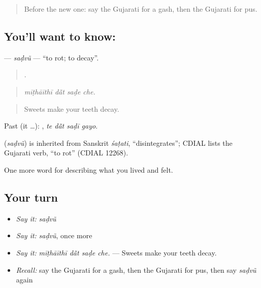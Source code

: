 \label{lesson:GU-C480-sadvu}



\begin{quote}
Before the new one: say the Gujarati for a gash, then the Gujarati for pus.
\end{quote}

\subsection*{You'll want to know: }
\textbf{} — \emph{saḍvũ} — \textquotedblleft{}to rot; to decay\textquotedblright{}.

\begin{quote}
   .
\end{quote}

\begin{quote}
\emph{mīṭhāīthī dā̃t saḍe che.}
\end{quote}

\begin{quote}
Sweets make your teeth decay.
\end{quote}

Past (it …):    , \emph{te dā̃t saḍī gayo}.

\begin{cousinweb}
\textbf{} (\emph{saḍvũ}) is inherited from Sanskrit \emph{śaṭati}, \textquotedblleft{}disintegrates\textquotedblright{}; CDIAL lists the Gujarati verb, \textquotedblleft{}to rot\textquotedblright{} (CDIAL 12268).
\end{cousinweb}

\begin{grammarlens}[title={What you've built}]
One more word for describing what you lived and felt.
\end{grammarlens}

\subsection*{Your turn}
\begin{itemize}
\raggedright
  \item \emph{Say it:} \emph{saḍvũ}
  \item \emph{Say it:} \emph{saḍvũ}, once more
  \item \emph{Say it:} \emph{mīṭhāīthī dā̃t saḍe che.} — Sweets make your teeth decay.
  \item \emph{Recall:} say the Gujarati for a gash, then the Gujarati for pus, then say \emph{saḍvũ} again
\end{itemize}

